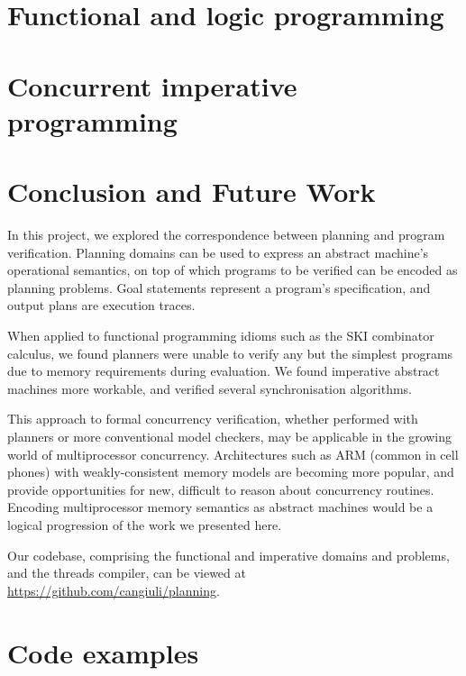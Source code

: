 \documentclass{article}
\begin{document}
\section{Functional and logic programming}



\section{Concurrent imperative programming}



\section{Conclusion and Future Work}

In this project, we explored the correspondence between planning and program verification. Planning domains can be used to express an abstract machine's operational semantics, on top of which programs to be verified can be encoded as planning problems. Goal statements represent a program's specification, and output plans are execution traces.

When applied to functional programming idioms such as the SKI combinator calculus, we found planners were unable to verify any but the simplest programs due to memory requirements during evaluation. We found imperative abstract machines more workable, and verified several synchronisation algorithms.

This approach to formal concurrency verification, whether performed with planners or more conventional model checkers, may be applicable in the growing world of multiprocessor concurrency. Architectures such as ARM (common in cell phones) with weakly-consistent memory models are becoming more popular, and provide opportunities for new, difficult to reason about concurrency routines. Encoding multiprocessor memory semantics as abstract machines would be a logical progression of the work we presented here.

Our codebase, comprising the functional and imperative domains and problems, and the threads compiler, can be viewed at \url{https://github.com/cangiuli/planning}.

{}


\newpage

\appendix
\section{Code examples}

\end{document}

